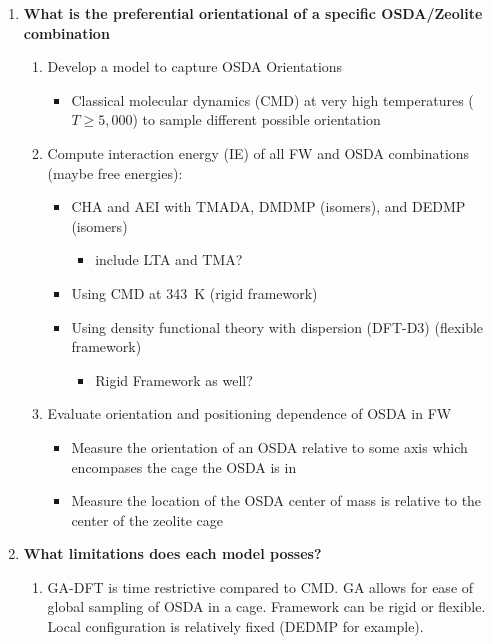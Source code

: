 \documentclass[journal=accacs,manuscript=article, email=true, layout=traditional]{achemso}
\begin{document}
\begin{enumerate}
\item \textbf{What is the preferential orientational of a specific OSDA/Zeolite combination}

\begin{enumerate}
\item Develop a model to capture OSDA Orientations
\begin{itemize}
\item Classical molecular dynamics (CMD) at very high temperatures (\(T \geq 5,000\)) to sample different possible orientation
\end{itemize}

\item Compute interaction energy (IE) of all FW and OSDA combinations (maybe free energies):
\begin{itemize}
\item CHA and AEI with TMADA, DMDMP (isomers), and DEDMP (isomers)
\begin{itemize}
\item include LTA and TMA?
\end{itemize}
\item Using CMD at \SI{343}{K} (rigid framework)
\item Using density functional theory with dispersion (DFT-D3) (flexible framework)
\begin{itemize}
\item Rigid Framework as well?
\end{itemize}
\end{itemize}

\item Evaluate orientation and positioning dependence of OSDA in FW
\begin{itemize}
\item Measure the orientation of an OSDA relative to some axis which encompases the cage the OSDA is in
\item Measure the location of the OSDA center of mass is relative to the center of the zeolite cage
\end{itemize}
\end{enumerate}

\item \textbf{What limitations does each model posses?}

\begin{enumerate}
\item GA-DFT is time restrictive compared to CMD. GA allows for ease of global sampling of OSDA in a cage. Framework can be rigid or flexible. Local configuration is relatively fixed (DEDMP for example).


\end{enumerate}
\end{enumerate}
\end{document}
